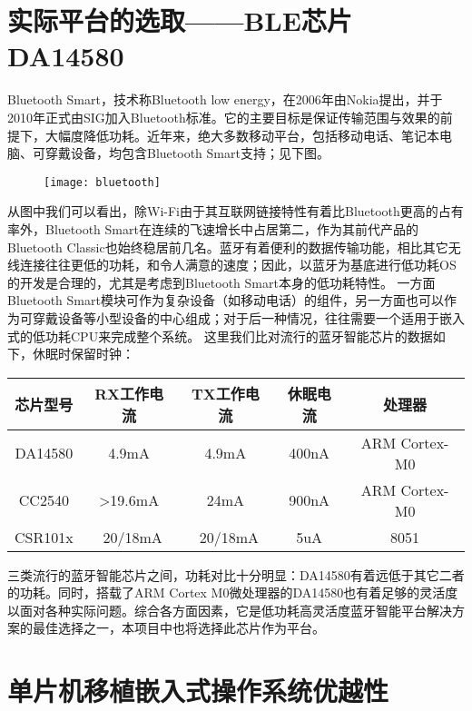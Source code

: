 \documentclass{ctexart}
\begin{document}
\section{实际平台的选取——BLE芯片DA14580}

Bluetooth Smart，技术称Bluetooth low energy，在2006年由Nokia提出，并于2010年正式由SIG加入Bluetooth标准。它的主要目标是保证传输范围与效果的前提下，大幅度降低功耗。近年来，绝大多数移动平台，包括移动电话、笔记本电脑、可穿戴设备，均包含Bluetooth Smart支持；见下图。\par
\begin{figure}[h]
\centering
\texttt{[image: bluetooth]}\par
\end{figure}
从图中我们可以看出，除Wi-Fi由于其互联网链接特性有着比Bluetooth更高的占有率外，Bluetooth Smart在连续的飞速增长中占居第二，作为其前代产品的Bluetooth Classic也始终稳居前几名。蓝牙有着便利的数据传输功能，相比其它无线连接往往更低的功耗，和令人满意的速度；因此，以蓝牙为基底进行低功耗OS的开发是合理的，尤其是考虑到Bluetooth Smart本身的低功耗特性。
一方面Bluetooth Smart模块可作为复杂设备（如移动电话）的组件，另一方面也可以作为可穿戴设备等小型设备的中心组成；对于后一种情况，往往需要一个适用于嵌入式的低功耗CPU来完成整个系统。
这里我们比对流行的蓝牙智能芯片的数据如下\cite{da14580}\cite{cc2540}\cite{csr101x}，休眠时保留时钟：
\begin{center}
\begin{tabular}{| c | c | c | c | c |}
\hline
芯片型号 & RX工作电流 & TX工作电流 & 休眠电流 & 处理器 \\
\hline
DA14580 & 4.9mA & 4.9mA & 400nA & ARM Cortex-M0 \\
\hline
CC2540 & >19.6mA & 24mA & 900nA & ARM Cortex-M0 \\
\hline
CSR101x & ~20/18mA & ~20/18mA & 5uA & 8051 \\
\hline
\end{tabular}
\end{center}
三类流行的蓝牙智能芯片之间，功耗对比十分明显：DA14580有着远低于其它二者的功耗。同时，搭载了ARM Cortex M0微处理器的DA14580也有着足够的灵活度以面对各种实际问题。综合各方面因素，它是低功耗高灵活度蓝牙智能平台解决方案的最佳选择之一，本项目中也将选择此芯片作为平台。

\section{单片机移植嵌入式操作系统优越性}
\end{document}
